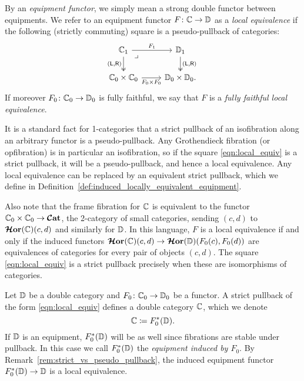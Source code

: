 \documentclass[11pt,oneside,article]{memoir}
\begin{document}
\begin{definition}
      \label{def:local_equivalence}
   By an \emph{equipment functor}, we simply mean a strong double functor between equipments. We refer to an equipment functor $F\colon\mathbb{C}\to\mathbb{D}$ as a \emph{local equivalence} if the following (strictly commuting) square is a pseudo-pullback of categories:
   \begin{equation} \begin{tikzcd}
         \label{eqn:local_equiv}
      \dcat{C}_1 \ar[r,"F_1"] \ar[d,two heads,"{(\lframe,\rframe)}"'] \ar[dr,phantom,"\lrcorner" very near start]
         & \dcat{D}_1 \ar[d,two heads,"{(\lframe,\rframe)}"] \\
      \dcat{C}_0\times\dcat{C}_0 \ar[r,"F_0\times F_0"']
         & \dcat{D}_0\times\dcat{D}_0.
   \end{tikzcd} \end{equation}
   If moreover $F_0\colon\mathbb{C}_0\to\mathbb{D}_0$ is fully faithful, we say that $F$ is a \emph{fully faithful local equivalence}.
\end{definition}

\begin{remark}
      \label{rem:strict_vs_pseudo_pullback}
   It is a standard fact for 1-categories that a strict pullback of an isofibration along an arbitrary functor is a pseudo-pullback. Any Grothendieck fibration (or opfibration) is in particular an isofibration, so if the square \eqref{eqn:local_equiv} is a strict pullback, it will be a pseudo-pullback, and hence a local equivalence. Any local equivalence can be replaced by an equivalent strict pullback, which we define in Definition~\ref{def:induced_locally_equivalent_equipment}.

   Also note that the frame fibration for $\mathbb{C}$ is equivalent to the functor $\mathbb{C}_0\times\mathbb{C}_0\to\bm{\mathcal{C}}\mathbf{at}$, the 2-category of
   small categories, sending $(c,d)$ to $\bm{\mathcal{H}}\mathbf{or}(\mathbb{C})(c,d)$ and similarly for $\mathbb{D}$. In this language, $F$ is a local equivalence if and only if the induced functors $\bm{\mathcal{H}}\mathbf{or}(\mathbb{C})(c,d)\to\bm{\mathcal{H}}\mathbf{or}(\mathbb{D})(F_0(c),F_0(d))$ are equivalences of categories for every pair of objects $(c,d)$. The square \eqref{eqn:local_equiv} is a strict pullback precisely when these are isomorphisms of categories.
\end{remark}

\begin{definition}
      \label{def:induced_locally_equivalent_equipment}
   Let $\mathbb{D}$ be a double category and $F_0\colon\mathbb{C}_0\to\mathbb{D}_0$ be a functor. A strict pullback of the form \eqref{eqn:local_equiv} defines a double category $\mathbb{C}$, which we denote
   \[
      \mathbb{C}\coloneqq F_0^*(\mathbb{D}).
   \]
   If $\mathbb{D}$ is an equipment, $F_0^*(\mathbb{D})$ will be as well since fibrations are stable under pullback. In this case we call $F_0^*(\mathbb{D})$ the \emph{equipment induced by $F_0$}. By Remark~\ref{rem:strict_vs_pseudo_pullback}, the induced equipment functor $F_0^*(\mathbb{D})\to\mathbb{D}$ is a local equivalence.
\end{definition}
\end{document}
